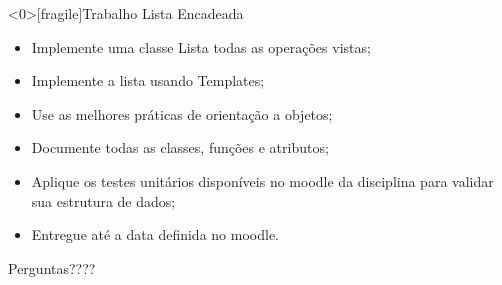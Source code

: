 \documentclass[12pt,table,xcolor={dvipsnames}]{beamer}
\begin{document}
\begin{frame}<0>[fragile]{Trabalho Lista Encadeada}
\begin{itemize}
\item Implemente uma classe Lista todas as operações vistas;
\item Implemente a lista usando Templates;
\item Use as melhores práticas de orientação a objetos;
\item Documente todas as classes, funções e atributos;
\item Aplique os testes unitários disponíveis no moodle da disciplina para validar sua estrutura de dados;
\item Entregue até a data definida no moodle.
\end{itemize}
\end{frame}

{
\begin{frame}

{\LARGE Perguntas????}

\end{frame}
}
\end{document}

